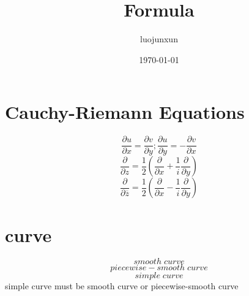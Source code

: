 \documentclass[12pt, a4paper, oneside]{ctexart}
\title{\huge\textbf{Formula}}
\author{luojunxun}
\date{\today}
\begin{document}
\section*{Cauchy-Riemann Equations}
\[\frac{\partial u}{\partial x} = \frac{\partial v}{\partial y};\frac{\partial u}{\partial y} = -\frac{\partial v}{\partial x}\]
\[\frac{\partial }{\partial z} = \frac{1}{2} (\frac{\partial }{\partial x}+\frac{1}{i} \frac{\partial }{\partial y})\]
\[\frac{\partial }{\partial \overline{z}} = \frac{1}{2} (\frac{\partial }{\partial x}-\frac{1}{i} \frac{\partial }{\partial y})\]

\section*{curve}
\[smooth\;curve\]
\[piecewise-smooth\;curve\]
\[simple\;curve\]
simple curve must be smooth curve or piecewise-smooth curve
\end{document}
